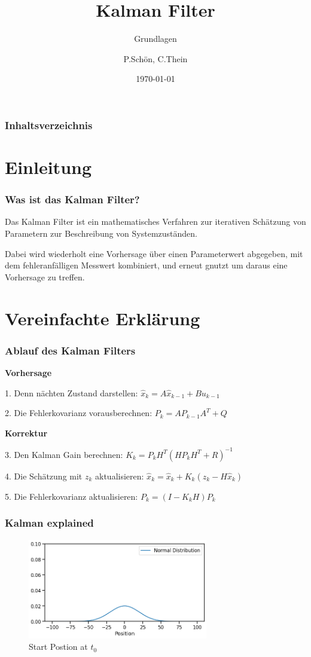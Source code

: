 \documentclass{beamer}
\title{Kalman Filter}
\subtitle{Grundlagen}
\author{P.Schön, C.Thein}
\date{\today}
\begin{document}
\frame{\titlepage}

\begin{frame}
    \frametitle{Inhaltsverzeichnis}
    \tableofcontents
\end{frame}

\section{Einleitung}

\begin{frame}
    \frametitle{Was ist das Kalman Filter?}
    Das Kalman Filter ist ein mathematisches Verfahren zur iterativen Schätzung von Parametern zur
    Beschreibung von Systemzuständen.

    Dabei wird wiederholt eine Vorhersage über einen Parameterwert
    abgegeben, mit dem fehleranfälligen Messwert kombiniert, und erneut gnutzt um daraus eine Vorhersage
    zu treffen.
\end{frame}

\section{Vereinfachte Erklärung}




\begin{frame}
    \frametitle{Ablauf des Kalman Filters}

    \textbf{Vorhersage}

    1. Denn nächten Zustand darstellen: \( \hat{x}_{k} = A\hat{x}_{k-1}+Bu_{k-1} \)

    2. Die Fehlerkovarianz vorausberechnen: \( P_{k}=AP_{k-1}A^{T}+Q \)

    \textbf{Korrektur}

    3. Den Kalman Gain berechnen: \( K_{k}=P_{k}H^{T}(HP_{k}H^T+R)^{-1} \)

    4. Die Schätzung mit \(z_k\) aktualisieren: \( \hat{x}_{k}=\hat{x}_{k}+K_{k}(z_{k}-H\hat{x}_{k}) \)

    5. Die Fehlerkovarianz aktualisieren: \( P_{k}=(I-K_{k}H)P_{k} \)
\end{frame}


\begin{frame}
    \frametitle{Kalman explained}
    \begin{figure}
        \centering
        \includegraphics[width=0.7\textwidth]{images/01_normal_distribution.png}
        \caption{Start Postion at \(t_0\)}
    \end{figure}
\end{frame}
\end{document}

